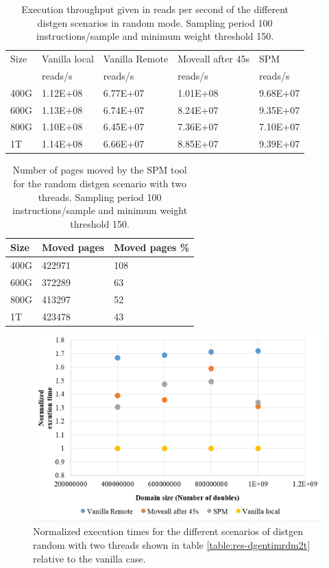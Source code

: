 \begin{table}
	\centering
		\begin{tabularx}{.9\textwidth}{|l|l|l|l|X|}
		\hline
			Size & Vanilla local & Vanilla Remote & Moveall after 45s & SPM \\
			 & reads/s & reads/s & reads/s & reads/s  \\
			\hline
			400G & 1.12E+08 & 6.77E+07 & 1.01E+08 & 9.68E+07\\
			\hline
			600G & 1.13E+08 & 6.74E+07 & 8.24E+07 & 9.35E+07\\
			\hline
			800G & 1.10E+08 & 6.45E+07 & 7.36E+07 & 7.10E+07\\
			\hline
			1T & 1.14E+08 & 6.66E+07 & 8.85E+07 & 9.39E+07\\
			\hline
		\end{tabularx}
		\caption{Execution throughput given in reads per second of the different distgen scenarios in random mode. Sampling period 100 instructions/sample and minimum weight threshold 150.}
		\label{table:res-dgentrgrdm2t}
\end{table}

\begin{table}
	\centering
		\begin{tabularx}{.6\textwidth}{|l|l|X|}
		\hline
			Size & Moved pages & Moved pages \%  \\
			\hline
			400G & 422971 & 108 \\
			\hline
			600G & 372289 & 63 \\
			\hline
			800G & 413297 & 52 \\
			\hline
			1T & 423478 & 43 \\
			\hline
		\end{tabularx}
		\caption{Number of pages moved by the SPM tool for the random distgen scenario with two threads. Sampling period 100 instructions/sample and minimum weight threshold 150.}
		\label{table:res-dgenmvdrdm2t}
\end{table}


\begin{figure}[th]
	\centering
		\includegraphics[width=.8\textwidth]{figures/time-dgentt-random.eps}
		\caption{Normalized execution times for the different scenarios of distgen random with two threads shown in table \ref{table:res-dgentimrdm2t} relative to the vanilla case.}
		\label{fig:res-dgentimrdm2t}
\end{figure}

